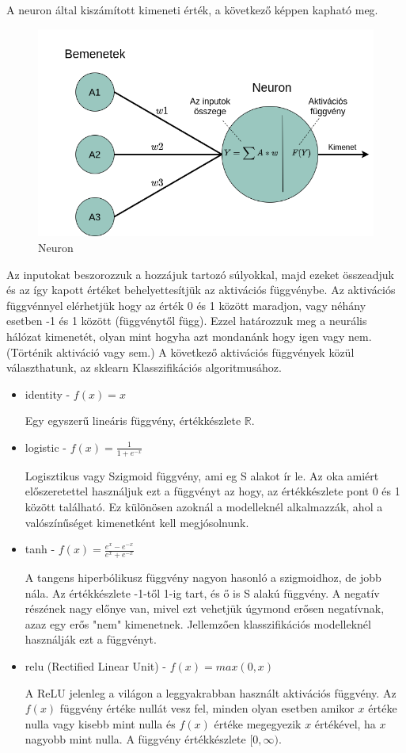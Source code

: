 \noindent A neuron által kiszámított kimeneti érték, a következő képpen kapható meg.
\begin{figure}[h!]
\centering
\includegraphics[scale=0.3]{images/neuron.png}
\caption{Neuron}
\label{fig:neuron}
\end{figure}

Az inputokat beszorozzuk a hozzájuk tartozó súlyokkal, majd ezeket összeadjuk és az így kapott értéket behelyettesítjük az aktivációs függvénybe.
Az aktivációs függvénnyel elérhetjük hogy az érték 0 és 1 között maradjon, vagy néhány esetben -1 és 1 között (függvénytől függ). Ezzel határozzuk meg a neurális hálózat kimenetét, olyan mint hogyha azt mondanánk hogy igen vagy nem. (Történik aktiváció vagy sem.) 
A következő aktivációs függvények közül választhatunk, az sklearn Klasszifikációs algoritmusához.
\begin{itemize}
\item identity - $f(x) = x$

Egy egyszerű lineáris függvény, értékkészlete $\mathbb{R}$.
\item logistic - $f(x) = \frac{1}{1+e^{-x}}$

Logisztikus vagy Szigmoid függvény, ami eg S alakot ír le. Az oka amiért előszeretettel használjuk ezt a függvényt az hogy, az értékkészlete pont 0 és 1 között található. Ez különösen azoknál a modelleknél alkalmazzák, ahol a valószínűséget kimenetként kell megjósolnunk.
\item tanh - $f(x) = \frac{e^{x}-e^{-x}}{e^{x}+e^{-x}}$

A tangens hiperbólikusz függvény nagyon hasonló a szigmoidhoz, de jobb nála. Az értékkészlete -1-től 1-ig tart, és ő is S alakú függvény.
A negatív részének nagy előnye van, mivel ezt vehetjük úgymond erősen negatívnak, azaz egy erős "nem" kimenetnek. Jellemzően klasszifikációs modelleknél használják ezt a függvényt.
\item relu (Rectified Linear Unit) - $f(x) = max(0,x)$

A ReLU jelenleg a világon a leggyakrabban használt aktivációs függvény.
Az $f(x)$ függvény értéke nullát vesz fel, minden olyan esetben amikor $x$ értéke nulla vagy kisebb mint nulla és $f(x)$ értéke megegyezik $x$ értékével, ha $x$ nagyobb mint nulla.
A függvény értékkészlete $[0,\infty)$.
\end{itemize}

